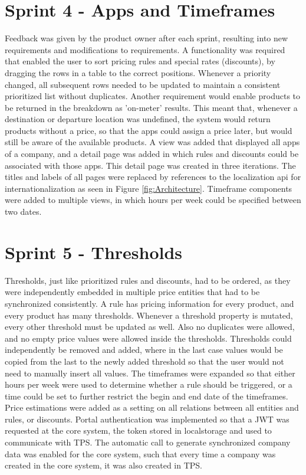 %
\section{Sprint 4 - Apps and Timeframes}
Feedback was given by the product owner after each sprint, resulting into new requirements and modifications to requirements. A functionality was required that enabled the user to sort pricing rules and special rates (discounts), by dragging the rows in a table to the correct positions. Whenever a priority changed, all subsequent rows needed to be updated to maintain a consistent prioritized list without duplicates. Another requirement would enable products to be returned in the breakdown as 'on-meter' results. This meant that, whenever a destination or departure location was undefined, the system would return products without a price, so that the apps could assign a price later, but would still be aware of the available products. A view was added that displayed all apps of a company, and a detail page was added in which rules and discounts could be associated with those apps. This detail page was created in three iterations. The titles and labels of all pages were replaced by references to the localization api for internationalization as seen in Figure \ref{fig:Architecture}. Timeframe components were added to multiple views, in which hours per week could be specified between two dates.

%
\section{Sprint 5 - Thresholds}
Thresholds, just like prioritized rules and discounts, had to be ordered, as they were independently embedded in multiple price entities that had to be synchronized consistently. A rule has pricing information for every product, and every product has many thresholds. Whenever a threshold property is mutated, every other threshold must be updated as well. Also no duplicates were allowed, and no empty price values were allowed inside the thresholds. Thresholds could independently be removed and added, where in the last case values would be copied from the last to the newly added threshold so that the user would not need to manually insert all values. The timeframes were expanded so that either hours per week were used to determine whether a rule should be triggered, or a time could be set to further restrict the begin and end date of the timeframes. Price estimations were added as a setting on all relations between all entities and rules, or discounts. Portal authentication was implemented so that a JWT was requested at the core system, the token stored in localstorage and used to communicate with TPS. The automatic call to generate synchronized company data was enabled for the core system, such that every time a company was created in the core system, it was also created in TPS.

